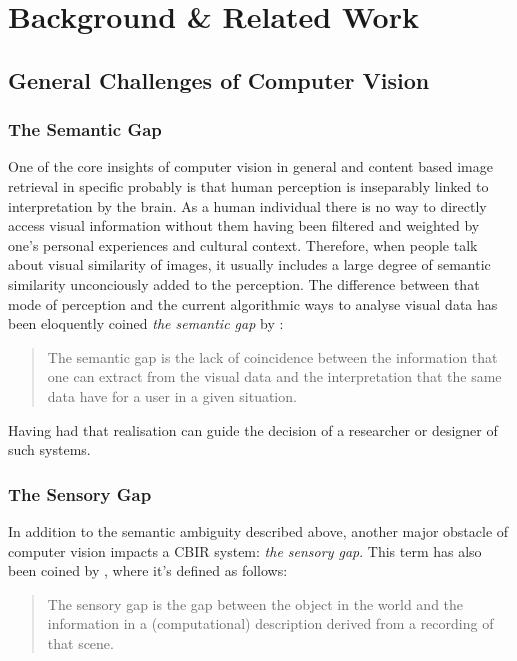 \chapter{Background \& Related Work}\label{ch:background}

\section{General Challenges of Computer Vision}

\subsection{The Semantic Gap}

One of the core insights of computer vision in general and content based image
retrieval in specific probably is that human perception is inseparably linked
to interpretation by the brain. As a human individual there is no way to
directly access visual information without them having been filtered and
weighted by one's personal experiences and cultural context. Therefore, when
people talk about visual similarity of images, it usually includes a large
degree of semantic similarity unconciously added to the perception. The
difference between that mode of perception and the current algorithmic ways to
analyse visual data has been eloquently coined \emph{the semantic gap} by
\autocite{smeulders_content-based_2000}:

\begin{quote}
The semantic gap is the lack of coincidence between the information that one
can extract from the visual data and the interpretation that the same data have
for a user in a given situation.
\end{quote}

Having had that realisation can guide the decision of a researcher or designer
of such systems.

\subsection{The Sensory Gap}

In addition to the semantic ambiguity described above, another major obstacle
of computer vision impacts a CBIR system: \emph{the sensory gap}. This term has
also been coined by \autocite{smeulders_content-based_2000}, where it's defined
as follows:

\begin{quote}
The sensory gap is the gap between the object in the world and the information
in a (computational) description derived from a recording of that scene.
\end{quote}

